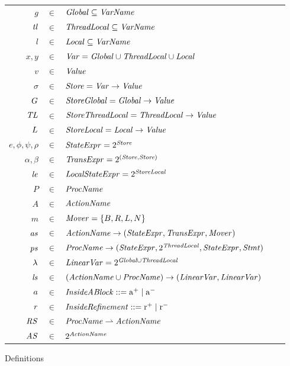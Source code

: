 \begin{figure}
\setlength{\tabcolsep}{3pt}
\begin{tabular}{rclcl}
$g$ & $\in$ & $\mathit{Global} \subseteq \mathit{VarName}$ \\
$\mathit{tl}$ & $\in$ & $\mathit{ThreadLocal} \subseteq \mathit{VarName}$ \\
$l$ & $\in$ & $\mathit{Local} \subseteq \mathit{VarName}$ \\
$x,y$ & $\in$ & $\mathit{Var} = \mathit{Global} \cup \mathit{ThreadLocal} \cup \mathit{Local}$ \\
$v$ &  $\in$ & $\mathit{Value}$ \\
$\sigma$ & $\in$ & $\mathit{Store} = \mathit{Var} \rightarrow \mathit{Value}$ \\
$G$ & $\in$ & $\mathit{StoreGlobal} = \mathit{Global} \rightarrow \mathit{Value}$ \\
$\mathit{TL}$ & $\in$ & $\mathit{StoreThreadLocal} = \mathit{ThreadLocal}  \rightarrow \mathit{Value}$ \\
$L$ & $\in$ & $\mathit{StoreLocal} = \mathit{Local} \rightarrow \mathit{Value}$ \\
$e, \phi, \psi, \rho$ & $\in$ & $\mathit{StateExpr} = 2^{\mathit{Store}}$ \\
$\alpha, \beta$ & $\in$ & $\mathit{TransExpr} = 2^{(\mathit{Store},\mathit{Store})}$ \\
$\mathit{le}$ & $\in$ & $\mathit{LocalStateExpr} = 2^{\mathit{StoreLocal}}$ \\
$P$ & $\in$ & $\mathit{ProcName}$ \\
$A$ & $\in$ & $\mathit{ActionName}$ \\
$m$ & $\in$ & $\mathit{Mover} = \{B,R,L,N\}$\\
$\mathit{as}$ & $\in$ & $\mathit{ActionName} \rightarrow (\mathit{StateExpr}, \mathit{TransExpr}, \mathit{Mover})$ \\
$\mathit{ps}$ & $\in$ & $\mathit{ProcName} \rightarrow (\mathit{StateExpr}, 2^{\mathit{ThreadLocal}}, \mathit{StateExpr}, \mathit{Stmt})$ \\
$\lambda$ & $\in$ & $\mathit{LinearVar} = 2^{\mathit{Global} \cup \mathit{ThreadLocal}}$ \\
$\mathit{ls}$ & $\in$ & $(\mathit{ActionName} \cup \mathit{ProcName}) \rightarrow (\mathit{LinearVar}, \mathit{LinearVar})$ \\
$a$ & $\in$ & $\mathit{InsideABlock} ::= \mathrm{a^+} \mid \mathrm{a^-}$ \\
$r$ & $\in$ & $\mathit{InsideRefinement} ::= \mathrm{r^+} \mid \mathrm{r^-}$ \\
$\mathit{RS}$ & $\in$ & $\mathit{ProcName} \rightharpoonup \mathit{ActionName}$ \\
$\mathit{AS}$ & $\in$ & $2^{\mathit{ActionName}}$ 
\end{tabular}
\caption{Definitions}
\label{fig:definitions}
\end{figure}

